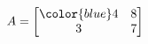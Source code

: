 \documentclass[preview]{standalone}
\begin{document}
\begin{align*}
A = \begin{bmatrix}
                        \color{blue}4 & 8\\
                        3 & 7
                    \end{bmatrix}
\end{align*}
\end{document}
